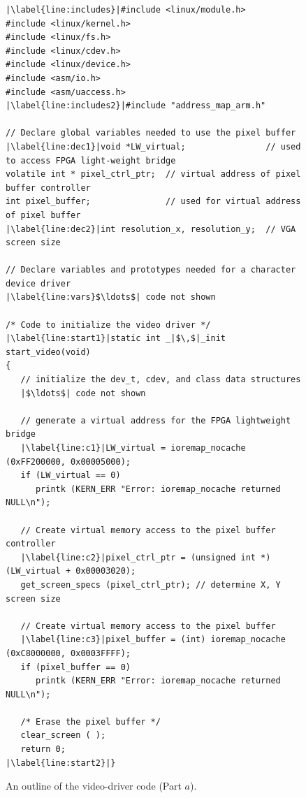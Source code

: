 \documentclass[epsfig,10pt,fullpage]{article}
\begin{document}
\lstset{language=C,numbers=left,escapechar=|}
\begin{figure}[h]
\begin{center}
\begin{minipage}[t]{15 cm}
\begin{lstlisting}[name=dots]
|\label{line:includes}|#include <linux/module.h>
#include <linux/kernel.h>
#include <linux/fs.h>
#include <linux/cdev.h>
#include <linux/device.h>
#include <asm/io.h>
#include <asm/uaccess.h>
|\label{line:includes2}|#include "address_map_arm.h"

// Declare global variables needed to use the pixel buffer
|\label{line:dec1}|void *LW_virtual;				// used to access FPGA light-weight bridge
volatile int * pixel_ctrl_ptr;	// virtual address of pixel buffer controller
int pixel_buffer;				// used for virtual address of pixel buffer
|\label{line:dec2}|int resolution_x, resolution_y;	// VGA screen size

// Declare variables and prototypes needed for a character device driver
|\label{line:vars}$\ldots$| code not shown

/* Code to initialize the video driver */
|\label{line:start1}|static int _|$\,$|_init start_video(void)
{
   // initialize the dev_t, cdev, and class data structures
   |$\ldots$| code not shown

   // generate a virtual address for the FPGA lightweight bridge
   |\label{line:c1}|LW_virtual = ioremap_nocache (0xFF200000, 0x00005000);
   if (LW_virtual == 0)
      printk (KERN_ERR "Error: ioremap_nocache returned NULL\n");

   // Create virtual memory access to the pixel buffer controller
   |\label{line:c2}|pixel_ctrl_ptr = (unsigned int *) (LW_virtual + 0x00003020);
   get_screen_specs (pixel_ctrl_ptr); // determine X, Y screen size

   // Create virtual memory access to the pixel buffer
   |\label{line:c3}|pixel_buffer = (int) ioremap_nocache (0xC8000000, 0x0003FFFF); 
   if (pixel_buffer == 0)
      printk (KERN_ERR "Error: ioremap_nocache returned NULL\n");

   /* Erase the pixel buffer */
   clear_screen ( );
   return 0;
|\label{line:start2}|}
\end{lstlisting}
\end{minipage}
\caption{An outline of the video-driver code (Part $a$).}
\label{fig:video}
\end{center}
\end{figure}
\clearpage
\newpage
\lstset{language=C,numbers=left,escapechar=|}
\end{document}
